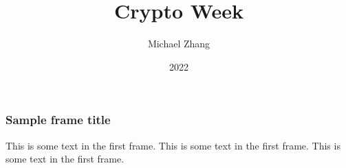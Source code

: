 \documentclass{beamer}
\title{Crypto Week}
\author{Michael Zhang}
\institute{GopherHack 2022-11-03}
\date{2022}
\begin{document}
\frame{\titlepage}

\begin{frame}
\frametitle{Sample frame title}
This is some text in the first frame. This is some text in the first frame. This is some text in the first frame.


\end{frame}
\end{document}
